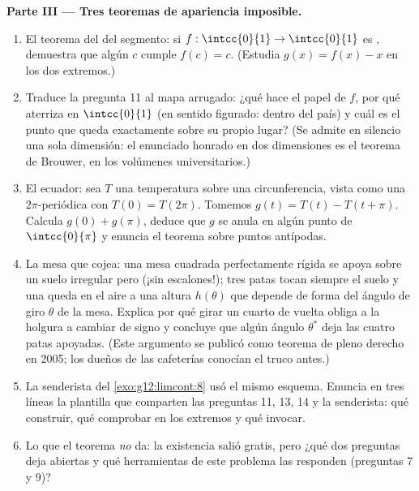 \begin{problem}
\medskip
\noindent\textbf{Parte III --- Tres teoremas de apariencia
imposible.}
\begin{enumerate}[resume]
  \item El teorema del  del segmento: si
        $f : \intcc{0}{1} \to \intcc{0}{1}$ es , demuestra que
        algún $c$ cumple $f(c) = c$. (Estudia $g(x) = f(x) - x$ en los dos
        extremos.)
  \item Traduce la pregunta 11 al mapa arrugado: ¿qué hace el papel de
        $f$, por qué aterriza en $\intcc{0}{1}$ (en sentido figurado:
        dentro del país) y cuál es el punto que queda exactamente sobre su
        propio lugar? (Se admite en silencio una sola dimensión: el
        enunciado honrado en dos dimensiones es el teorema de Brouwer, en
        los volúmenes universitarios.)
  \item El ecuador: sea $T$ una temperatura  sobre una
        circunferencia, vista como una  $2\pi$-periódica con
        $T(0) = T(2\pi)$. Tomemos $g(t) = T(t) - T(t + \pi)$. Calcula
        $g(0) + g(\pi)$, deduce que $g$ se anula en algún punto de
        $\intcc{0}{\pi}$ y enuncia el teorema sobre puntos antípodas.
  \item La mesa que cojea: una mesa cuadrada perfectamente rígida se apoya
        sobre un suelo irregular pero  (¡sin escalones!); tres
        patas tocan siempre el suelo y una queda en el aire a una altura
        $h(\theta)$ que depende de forma  del ángulo de giro
        $\theta$ de la mesa. Explica por qué girar un cuarto de vuelta
        obliga a la holgura a cambiar de signo y concluye que algún ángulo
        $\theta^*$ deja las cuatro patas apoyadas. (Este argumento se
        publicó como teorema de pleno derecho en 2005; los dueños de las
        cafeterías conocían el truco antes.)
  \item La senderista del \cref{exo:g12:limcont:8} usó el mismo esquema.
        Enuncia en tres líneas la plantilla que comparten las preguntas 11,
        13, 14 y la senderista: qué  construir, qué comprobar en los
        extremos y qué invocar.
  \item Lo que el teorema \emph{no} da: la existencia salió gratis, pero
        ¿qué dos preguntas deja abiertas y qué herramientas de este
        problema las responden (preguntas 7 y 9)?
\end{enumerate}


\end{problem}
